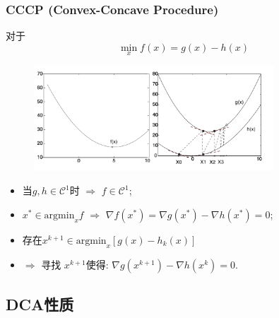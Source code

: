 \documentclass{beamer}
\begin{document}
\begin{frame}
\frametitle{CCCP (Convex-Concave Procedure)}
对于
$$\min_x f(x) = g(x)-h(x)
$$
\begin{figure}
\centering
\includegraphics[width=0.8\textwidth]{picture/CCCP-algorithm.png}
\end{figure}
\begin{itemize}
\item<only@1-2> 当$ g,h \in \mathcal{C}^1$时  $\Rightarrow$ $f\in \mathcal{C}^1$;
\item<only@2> $x^*\in\text{argmin}_x f$  $\Rightarrow$ $\nabla f(x^*) = \nabla g(x^*) - \nabla h(x^*) = 0$;
\item<only@3-> 存在$x^{k+1}\in\text{argmin}_x [g(x)-h_k(x)]$
 \item<only@4->    $\Rightarrow$    寻找 $x^{k+1}$使得:     $\nabla g(x^{k+1}) - \nabla h(x^k) = 0$.

\end{itemize}


\end{frame}


\subsection{DCA性质}
\end{document}
